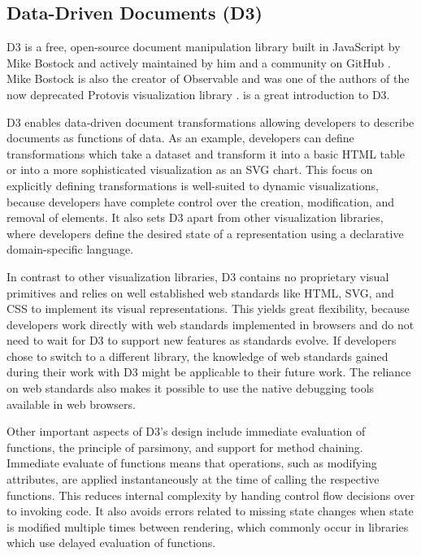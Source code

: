 \subsection{Data-Driven Documents (D3)}

D3 \parencite{D3} is a free, open-source document manipulation library
built in JavaScript by Mike Bostock and actively maintained by him and
a community on GitHub \parencite{D3JS}. Mike Bostock is also the
creator of Observable \parencite{Observable} and was one of the
authors of the now deprecated Protovis visualization library
\parencite{Protovis}. \textcite{Wattenberger-D3} is a great
introduction to D3.

D3 enables data-driven document transformations allowing developers to
describe documents as functions of data. As an example, developers can
define transformations which take a dataset and transform it into a
basic HTML table or into a more sophisticated visualization as an SVG
chart. This focus on explicitly defining transformations is
well-suited to dynamic visualizations, because developers have
complete control over the creation, modification, and removal of
elements. It also sets D3 apart from other visualization libraries,
where developers define the desired state of a representation using a
declarative domain-specific language.

In contrast to other visualization libraries, D3 contains no
proprietary visual primitives and relies on well established web
standards like HTML, SVG, and CSS to implement its visual
representations. This yields great flexibility, because developers
work directly with web standards implemented in browsers and do not
need to wait for D3 to support new features as standards
evolve. If developers chose to switch to a different library, the
knowledge of web standards gained during their work with D3 might be
applicable to their future work. The reliance on web standards also
makes it possible to use the native debugging tools available in web
browsers.


Other important aspects of D3's design include immediate evaluation of
functions, the principle of parsimony, and support for method
chaining. Immediate evaluate of functions means that operations, such
as modifying attributes, are applied instantaneously at the time of
calling the respective functions. This reduces internal complexity by
handing control flow decisions over to invoking code. It also avoids
errors related to missing state changes when state is modified
multiple times between rendering, which commonly occur in libraries
which use delayed evaluation of functions.

